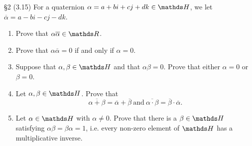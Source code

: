 \documentclass{homework}
\begin{document}
\begin{problem}{\S 2}
  (3.15) For a quaternion $\alpha=a+bi+cj+dk\in \HH$, we let $\overline{\alpha}=a-bi-cj-dk$.
  \begin{enumerate}[label=(\alph*)]
    \item Prove that $\alpha\overline{\alpha}\in \R$.
    \item Prove that $\alpha\overline{\alpha}=0$ if and only if $\alpha=0$.
    \item Suppose that $\alpha,\beta\in \HH$ and that $ \alpha\beta=0$. Prove that either
      $\alpha=0$ or $\beta=0$.
    \item Let $\alpha,\beta\in \HH$. Prove that \[
      \overline{\alpha+\beta}=\overline{\alpha}+\overline{\beta} ~\text{and}~ \overline{\alpha\cdot
      \beta}=\overline{\beta}\cdot \overline{\alpha}
      .\] 
    \item Let $\alpha\in \HH$ with $ \alpha\neq 0$. Prove that there is a $\beta\in \HH$
      satisfying $\alpha\beta=\beta\alpha=1$, i.e. every non-zero element of $ \HH$ has a
      multiplicative inverse.
  \end{enumerate}
\end{problem}
\end{document}
